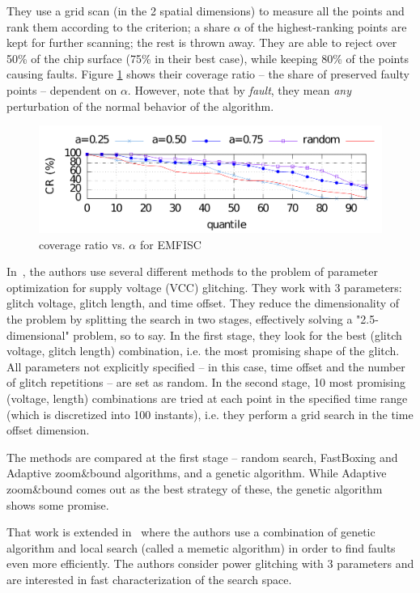 \documentclass[times, utf8, diplomski]{fer}
\begin{document}
They use a grid scan (in the 2 spatial dimensions) to measure all the points
and rank them according to the criterion; a share $\alpha$ of the highest-ranking
points are kept for further scanning; the rest is thrown away.
They are able to reject over 50\% of the chip surface (75\% in their best case),
while keeping 80\% of the points causing faults. Figure \ref{fig:emfisc} shows
their coverage ratio -- the share of preserved faulty points -- dependent on $\alpha$.
However, note that by \emph{fault}, they mean \emph{any} perturbation of the
normal behavior of the algorithm.

\begin{figure}[htb]
    \centering
    \includegraphics{images/emfisc.png}
    \caption{coverage ratio vs. $\alpha$ for EMFISC}
    \label{fig:emfisc}
\end{figure}


In~\cite{GlitchItIfYouCan}, the authors use several different methods to the
problem of parameter optimization for supply voltage (VCC) glitching. They work
with 3 parameters: glitch voltage, glitch length, and time offset. They reduce
the dimensionality of the problem by splitting the search in two stages,
effectively solving a "2.5-dimensional" problem, so to say. In the first stage,
they look for the best (glitch voltage, glitch length) combination, i.e. the
most promising shape of the glitch. All parameters not explicitly specified
 -- in this case, time offset and the number of glitch repetitions -- are
set as random. In the second stage, 10 most promising (voltage, length)
combinations are tried at each point in the specified time range (which is
discretized into 100 instants), i.e. they perform a grid search in the time
offset dimension.

The methods are compared at the first stage -- random search, FastBoxing and
Adaptive zoom\&bound algorithms, and a genetic algorithm. While Adaptive
zoom\&bound comes out as the best strategy of these, the genetic algorithm
shows some promise. 

That work is extended in~\cite{FI_memetic} where the authors use a combination of
genetic algorithm and local search (called a memetic algorithm) in order to find
faults even more efficiently. The authors consider power glitching with 3
parameters and are interested in fast characterization of the search space.
\end{document}
